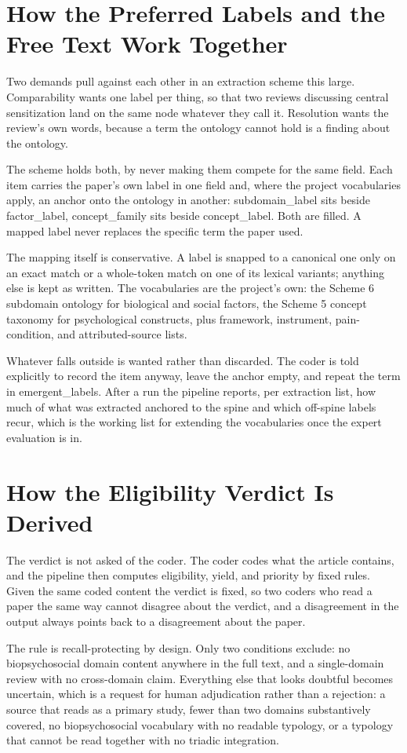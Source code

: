 \documentclass[11pt]{article}
\begin{document}
\section*{How the Preferred Labels and the Free Text Work Together}
Two demands pull against each other in an extraction scheme this large. Comparability wants one label per thing, so that two reviews discussing central sensitization land on the same node whatever they call it. Resolution wants the review's own words, because a term the ontology cannot hold is a finding about the ontology.

The scheme holds both, by never making them compete for the same field. Each item carries the paper's own label in one field and, where the project vocabularies apply, an anchor onto the ontology in another: subdomain\_label sits beside factor\_label, concept\_family sits beside concept\_label. Both are filled. A mapped label never replaces the specific term the paper used.

The mapping itself is conservative. A label is snapped to a canonical one only on an exact match or a whole-token match on one of its lexical variants; anything else is kept as written. The vocabularies are the project's own: the Scheme 6 subdomain ontology for biological and social factors, the Scheme 5 concept taxonomy for psychological constructs, plus framework, instrument, pain-condition, and attributed-source lists.

Whatever falls outside is wanted rather than discarded. The coder is told explicitly to record the item anyway, leave the anchor empty, and repeat the term in emergent\_labels. After a run the pipeline reports, per extraction list, how much of what was extracted anchored to the spine and which off-spine labels recur, which is the working list for extending the vocabularies once the expert evaluation is in.


\section*{How the Eligibility Verdict Is Derived}
The verdict is not asked of the coder. The coder codes what the article contains, and the pipeline then computes eligibility, yield, and priority by fixed rules. Given the same coded content the verdict is fixed, so two coders who read a paper the same way cannot disagree about the verdict, and a disagreement in the output always points back to a disagreement about the paper.

The rule is recall-protecting by design. Only two conditions exclude: no biopsychosocial domain content anywhere in the full text, and a single-domain review with no cross-domain claim. Everything else that looks doubtful becomes uncertain, which is a request for human adjudication rather than a rejection: a source that reads as a primary study, fewer than two domains substantively covered, no biopsychosocial vocabulary with no readable typology, or a typology that cannot be read together with no triadic integration.
\end{document}
